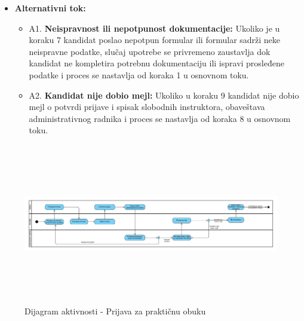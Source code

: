 \begin{itemize}
\item \textbf{Alternativni tok:}  
   \begin{itemize}
   \item A1. \textbf{Neispravnost ili nepotpunost dokumentacije:}
  Ukoliko je u koraku 7 kandidat poslao nepotpun formular ili formular sadrži neke neispravne podatke, slučaj upotrebe se privremeno zaustavlja dok kandidat ne kompletira potrebnu dokumentaciju ili ispravi prosleđene podatke i proces se nastavlja od koraka 1 u osnovnom toku.
  \item A2. \textbf{Kandidat nije dobio mejl:}
  Ukoliko u koraku 9 kandidat nije dobio mejl o potvrdi prijave i spisak slobodnih instruktora, obaveštava administrativnog radnika i proces se nastavlja od koraka 8 u osnovnom toku.
   \end{itemize}

\end{itemize}  

\begin{figure}[H]
  \begin{center}
      \includegraphics[width=140mm, height=70mm]{Diagrams/dijagram_aktivnosti_prijava_za_prakticnu_obuku.png}
  \end{center}
  \caption {Dijagram aktivnosti - Prijava za praktičnu obuku}
  \label{activity_prijava_za_prakticnu_obuku}

\end{figure}

